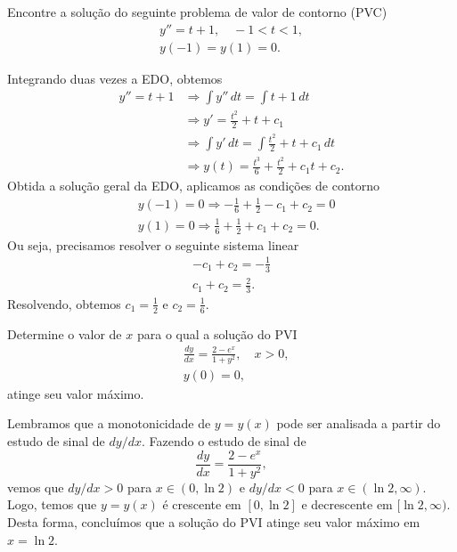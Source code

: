 \begin{exeresol}
  Encontre a solução do seguinte problema de valor de contorno (PVC)
  \begin{align}
    y'' = t + 1,\quad -1 < t < 1, \\
    y(-1) = y(1) = 0.
  \end{align}
\end{exeresol}
\begin{resol}
  Integrando duas vezes a EDO, obtemos
  \begin{align}
    y'' = t + 1 &\Rightarrow \int y''\,dt = \int t+1\,dt \\
                &\Rightarrow y' = \frac{t^2}{2} + t + c_1 \\
                &\Rightarrow \int y'\,dt = \int \frac{t^2}{2} + t + c_1 \,dt \\
                &\Rightarrow y(t) =  \frac{t^3}{6} + \frac{t^2}{2} + c_1t + c_2.
  \end{align}
  Obtida a solução geral da EDO, aplicamos as condições de contorno
  \begin{align}
    &y(-1) = 0 \Rightarrow -\frac{1}{6} + \frac{1}{2} - c_1 + c_2 = 0\\
    &y(1) = 0 \Rightarrow \frac{1}{6} + \frac{1}{2} + c_1 + c_2 = 0.
  \end{align}
  Ou seja, precisamos resolver o seguinte sistema linear
  \begin{align}
    -c_1 + c_2 = -\frac{1}{3} \\
    c_1 + c_2 = \frac{2}{3}.
  \end{align}
  Resolvendo, obtemos $c_1 = \frac{1}{2}$ e $c_2 = \frac{1}{6}$.
\end{resol}

\begin{exeresol}
  Determine o valor de $x$ para o qual a solução do PVI
  \begin{align}
    &\frac{dy}{dx} = \frac{2-e^x}{1 + y^2},\quad x>0,\\
    &y(0)=0,
  \end{align}
  atinge seu valor máximo.
\end{exeresol}
\begin{resol}
  Lembramos que a monotonicidade de $y = y(x)$ pode ser analisada a partir do estudo de sinal de $dy/dx$. Fazendo o estudo de sinal de
  \begin{equation}
    \frac{dy}{dx} = \frac{2-e^x}{1+y^2},
  \end{equation}
  vemos que $dy/dx > 0$ para $x\in (0, \ln 2)$ e $dy/dx < 0$ para $x\in (\ln 2, \infty)$. Logo, temos que $y = y(x)$ é crescente em $[0, \ln 2]$ e decrescente em $[\ln 2, \infty)$. Desta forma, concluímos que a solução do PVI atinge seu valor máximo em $x = \ln 2$.
\end{resol}

